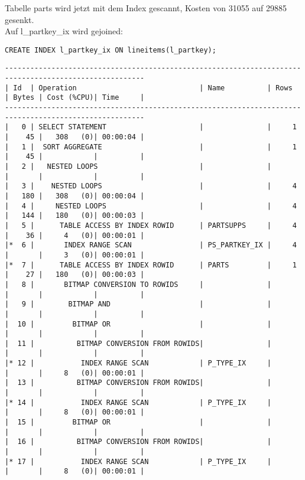 \documentclass[10pt]{article}
\begin{document}
Tabelle parts wird jetzt mit dem Index gescannt, Kosten von 31055 auf 29885 gesenkt. \\ 
Auf l\_partkey\_ix wird gejoined:
\begin{lstlisting}[style=sql]
CREATE INDEX l_partkey_ix ON lineitems(l_partkey);
\end{lstlisting}
\begin{lstlisting}[style=queryexecutionplan]
-------------------------------------------------------------------------------------------------------
| Id  | Operation                             | Name          | Rows  | Bytes | Cost (%CPU)| Time     |
-------------------------------------------------------------------------------------------------------
|   0 | SELECT STATEMENT                      |               |     1 |    45 |   308   (0)| 00:00:04 |
|   1 |  SORT AGGREGATE                       |               |     1 |    45 |            |          |
|   2 |   NESTED LOOPS                        |               |       |       |            |          |
|   3 |    NESTED LOOPS                       |               |     4 |   180 |   308   (0)| 00:00:04 |
|   4 |     NESTED LOOPS                      |               |     4 |   144 |   180   (0)| 00:00:03 |
|   5 |      TABLE ACCESS BY INDEX ROWID      | PARTSUPPS     |     4 |    36 |     4   (0)| 00:00:01 |
|*  6 |       INDEX RANGE SCAN                | PS_PARTKEY_IX |     4 |       |     3   (0)| 00:00:01 |
|*  7 |      TABLE ACCESS BY INDEX ROWID      | PARTS         |     1 |    27 |   180   (0)| 00:00:03 |
|   8 |       BITMAP CONVERSION TO ROWIDS     |               |       |       |            |          |
|   9 |        BITMAP AND                     |               |       |       |            |          |
|  10 |         BITMAP OR                     |               |       |       |            |          |
|  11 |          BITMAP CONVERSION FROM ROWIDS|               |       |       |            |          |
|* 12 |           INDEX RANGE SCAN            | P_TYPE_IX     |       |       |     8   (0)| 00:00:01 |
|  13 |          BITMAP CONVERSION FROM ROWIDS|               |       |       |            |          |
|* 14 |           INDEX RANGE SCAN            | P_TYPE_IX     |       |       |     8   (0)| 00:00:01 |
|  15 |         BITMAP OR                     |               |       |       |            |          |
|  16 |          BITMAP CONVERSION FROM ROWIDS|               |       |       |            |          |
|* 17 |           INDEX RANGE SCAN            | P_TYPE_IX     |       |       |     8   (0)| 00:00:01 |

\end{lstlisting}
\end{document}
